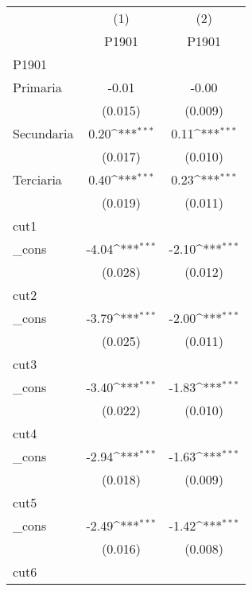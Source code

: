 {
\def\sym#1{\ifmmode^{#1}\else\(^{#1}\)\fi}
\begin{tabular}{l*{2}{c}}
\hline\hline
            &\multicolumn{1}{c}{(1)}&\multicolumn{1}{c}{(2)}\\
            &\multicolumn{1}{c}{P1901}&\multicolumn{1}{c}{P1901}\\
\hline
P1901       &                     &                     \\
Primaria    &       -0.01         &       -0.00         \\
            &     (0.015)         &     (0.009)         \\
[1em]
Secundaria  &        0.20\sym{***}&        0.11\sym{***}\\
            &     (0.017)         &     (0.010)         \\
[1em]
Terciaria   &        0.40\sym{***}&        0.23\sym{***}\\
            &     (0.019)         &     (0.011)         \\
\hline
cut1        &                     &                     \\
\_cons      &       -4.04\sym{***}&       -2.10\sym{***}\\
            &     (0.028)         &     (0.012)         \\
\hline
cut2        &                     &                     \\
\_cons      &       -3.79\sym{***}&       -2.00\sym{***}\\
            &     (0.025)         &     (0.011)         \\
\hline
cut3        &                     &                     \\
\_cons      &       -3.40\sym{***}&       -1.83\sym{***}\\
            &     (0.022)         &     (0.010)         \\
\hline
cut4        &                     &                     \\
\_cons      &       -2.94\sym{***}&       -1.63\sym{***}\\
            &     (0.018)         &     (0.009)         \\
\hline
cut5        &                     &                     \\
\_cons      &       -2.49\sym{***}&       -1.42\sym{***}\\
            &     (0.016)         &     (0.008)         \\
\hline
cut6        &                     &                     \\

\end{tabular}}

